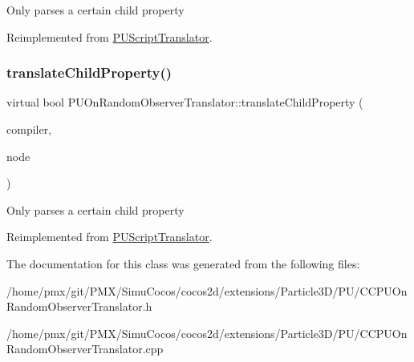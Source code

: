 Only parses a certain child property 

Reimplemented from \hyperlink{classPUScriptTranslator_a0374d83a8a04e57918975d525e0f8fe8}{P\+U\+Script\+Translator}.

\mbox{\label{classPUOnRandomObserverTranslator_abd476e7be1a8439a15b0ed5ec53074e4}} 
\subsubsection{\texorpdfstring{translate\+Child\+Property()}{translateChildProperty()}\hspace{0.1cm}{\footnotesize\ttfamily [2/2]}}
{\footnotesize\ttfamily virtual bool P\+U\+On\+Random\+Observer\+Translator\+::translate\+Child\+Property (\begin{DoxyParamCaption}\item[{\hyperlink{classPUScriptCompiler}{P\+U\+Script\+Compiler} $\ast$}]{compiler,  }\item[{\hyperlink{classPUAbstractNode}{P\+U\+Abstract\+Node} $\ast$}]{node }\end{DoxyParamCaption})\hspace{0.3cm}{\ttfamily [virtual]}}

Only parses a certain child property 

Reimplemented from \hyperlink{classPUScriptTranslator_a0374d83a8a04e57918975d525e0f8fe8}{P\+U\+Script\+Translator}.



The documentation for this class was generated from the following files\+:\begin{DoxyCompactItemize}
\item 
/home/pmx/git/\+P\+M\+X/\+Simu\+Cocos/cocos2d/extensions/\+Particle3\+D/\+P\+U/C\+C\+P\+U\+On\+Random\+Observer\+Translator.\+h\item 
/home/pmx/git/\+P\+M\+X/\+Simu\+Cocos/cocos2d/extensions/\+Particle3\+D/\+P\+U/C\+C\+P\+U\+On\+Random\+Observer\+Translator.\+cpp\end{DoxyCompactItemize}
